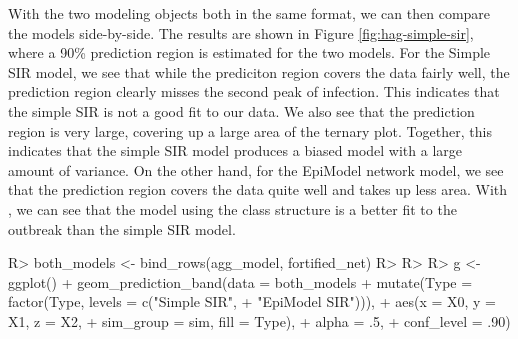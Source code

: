 \documentclass[
  shortnames]{jss}
\begin{document}
With the two modeling objects both in the same format, we can then
compare the models side-by-side. The results are shown in Figure
\ref{fig:hag-simple-sir}, where a 90\% prediction region is estimated
for the two models. For the Simple SIR model, we see that while the
prediciton region covers the data fairly well, the prediction region
clearly misses the second peak of infection. This indicates that the
simple SIR is not a good fit to our data. We also see that the
prediction region is very large, covering up a large area of the ternary
plot. Together, this indicates that the simple SIR model produces a
biased model with a large amount of variance. On the other hand, for the
EpiModel network model, we see that the prediction region covers the
data quite well and takes up less area. With , we can
see that the model using the class structure is a better fit to the
outbreak than the simple SIR model.

\begin{CodeChunk}
\begin{CodeInput}
R> both_models <- bind_rows(agg_model, fortified_net)
R> 
R> 
R> g <- ggplot() + geom_prediction_band(data = both_models %
+                   mutate(Type = factor(Type, levels = c("Simple SIR", 
+                                                         "EpiModel SIR"))),
+          aes(x = X0, y = X1, z = X2,
+               sim_group = sim, fill = Type),
+          alpha = .5,
+          conf_level = .90) 
\end{CodeInput}
\end{CodeChunk}
\end{document}
